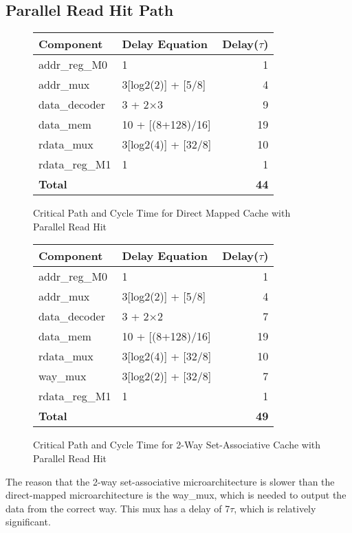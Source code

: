 \documentclass[10pt]{article}
\begin{document}
\subsection{Parallel Read Hit Path}
\begin{figure}[H]
\centering
\begin{tabular}{@{\extracolsep{3pt}}llr@{}}
\hline
\textbf{Component} & \textbf{Delay Equation} & \textbf{Delay($\tau$)} \\
\hline
addr\_reg\_M0 & 1 & 1 \\
addr\_mux	& 3[log2(2)] + [5/8] & 4 \\
data\_decoder& 3 + 2$\times$3 & 9 \\
data\_mem	& 10 + [(8+128)/16] & 19 \\
rdata\_mux	& 3[log2(4)] + [32/8] & 10 \\
rdata\_reg\_M1& 1 & 1 \\
\hline
\textbf{Total} & & \textbf{44} \\
\hline
\end{tabular}
\caption{Critical Path and Cycle Time for Direct Mapped Cache with
\\ Parallel Read Hit}
\end{figure}
\begin{figure}[H]
\centering
\begin{tabular}{@{\extracolsep{3pt}}llr@{}}
\hline
\textbf{Component} & \textbf{Delay Equation} & \textbf{Delay($\tau$)} \\
\hline
addr\_reg\_M0 & 1 & 1 \\
addr\_mux	& 3[log2(2)] + [5/8] & 4 \\
data\_decoder& 3 + 2$\times$2 & 7 \\
data\_mem	& 10 + [(8+128)/16] & 19 \\
rdata\_mux	& 3[log2(4)] + [32/8] & 10 \\
way\_mux		& 3[log2(2)] + [32/8] & 7 \\
rdata\_reg\_M1& 1 & 1 \\
\hline
\textbf{Total} & & \textbf{49} \\
\hline
\end{tabular}
\caption{Critical Path and Cycle Time for 2-Way Set-Associative Cache with
\\ Parallel Read Hit}
\end{figure}
The reason that the 2-way set-associative microarchitecture is slower than the direct-mapped microarchitecture is the way\_mux, which is needed to output the data from the correct way. This mux has a delay of 7$\tau$, which is relatively significant. 
\end{document}

